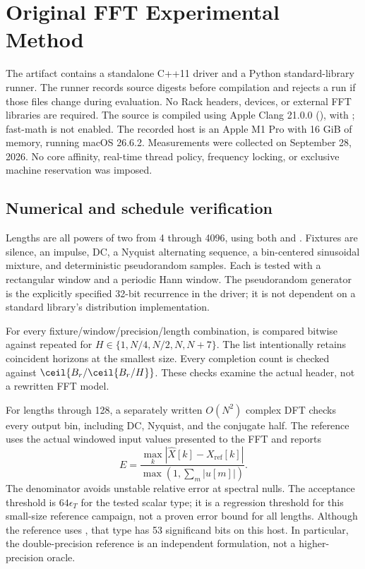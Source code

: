\section{Original FFT Experimental Method}
\label{sec:method}
The artifact contains a standalone C++11 driver and a Python standard-library
runner. The runner records source digests before compilation and rejects a run
if those files change during evaluation. No Rack headers, devices, or external
FFT libraries are required. The source is compiled using Apple Clang
21.0.0 (), with
; fast-math is not enabled.
The recorded host is an Apple M1 Pro with 16 GiB of memory, running macOS
26.6.2. Measurements were collected on September 28, 2026. No core affinity,
real-time thread policy, frequency locking, or exclusive machine reservation
was imposed.

\subsection{Numerical and schedule verification}
Lengths are all powers of two from 4 through 4096, using both 
and . Fixtures are silence, an impulse, DC, a Nyquist alternating
sequence, a bin-centered sinusoidal mixture, and deterministic pseudorandom
samples. Each is tested with a rectangular window and a periodic Hann window.
The pseudorandom generator is the explicitly specified 32-bit recurrence in the
driver; it is not dependent on a standard library's distribution implementation.

For every fixture/window/precision/length combination,  is
compared bitwise against repeated  for
$H\in\{1,N/4,N/2,N,N+7\}$. The list intentionally retains coincident horizons
at the smallest size. Every completion count is checked against
$\ceil{B_r/\ceil{B_r/H}}$. These checks examine the actual header, not a rewritten
FFT model.

For lengths through 128, a separately written $O(N^2)$ complex DFT checks every
output bin, including DC, Nyquist, and the conjugate half. The reference uses
the actual windowed input values presented to the FFT and reports
\begin{equation}
 E=\frac{\max_k|\widehat X[k]-X_{\mathrm{ref}}[k]|}
          {\max(1,\sum_m|u[m]|)}.
 \label{eq:error}
\end{equation}
The denominator avoids unstable relative error at spectral nulls. The acceptance
threshold is $64\epsilon_T$ for the tested scalar type; it is a regression
threshold for this small-size reference campaign, not a proven error bound for
all lengths. Although the reference uses , that type has 53
significand bits on this host. In particular, the double-precision reference is
an independent formulation, not a higher-precision oracle.

